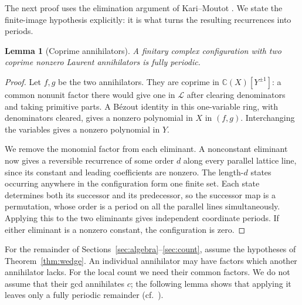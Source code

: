 \documentclass[11pt]{article}
\numberwithin{equation}{section}
\newtheorem{lemma}[theorem]{Lemma}
\theoremstyle{definition}
\theoremstyle{remark}
\newcommand{\C}{\mathbb C}
\newcommand{\Laur}{\mathscr L}
\begin{document}
The next proof uses the elimination argument of Kari--Moutot \cite[Lemma~8]{KMalg}. We state the
finite-image hypothesis explicitly: it is what turns the resulting recurrences into periods.

\begin{lemma}[Coprime annihilators]\label{lem:coprime}
A finitary complex configuration with two coprime nonzero Laurent annihilators is fully periodic.
\end{lemma}
\begin{proof}
Let $f,g$ be the two annihilators. They are coprime in $\C(X)[Y^{\pm1}]$: a common nonunit factor
there would give one in $\Laur$ after clearing denominators and taking primitive parts. A B\'ezout
identity in this one-variable ring, with denominators cleared, gives a nonzero polynomial in $X$ in
$(f,g)$. Interchanging the variables gives a nonzero polynomial in $Y$.

We remove the monomial factor from each eliminant. A nonconstant eliminant now gives a reversible
recurrence of some order $d$ along every parallel lattice line, since its constant and leading
coefficients are nonzero. The length-$d$ states occurring anywhere in the configuration form one
finite set. Each state determines both its successor and its predecessor, so the successor map is a
permutation, whose order is a period on all the parallel lines simultaneously. Applying this to the
two eliminants gives independent coordinate periods. If either eliminant is a nonzero constant,
the configuration is zero.
\end{proof}

For the remainder of Sections~\ref{sec:algebra}--\ref{sec:count}, assume the hypotheses of
Theorem~\ref{thm:wedge}. An individual annihilator may have factors which another annihilator lacks.
For the local count we need their common factors. We do not assume that their gcd annihilates $c$; the
following lemma shows that applying it leaves only a fully periodic remainder
(cf.~\cite[Corollaries~28--29]{KS}).
\end{document}
